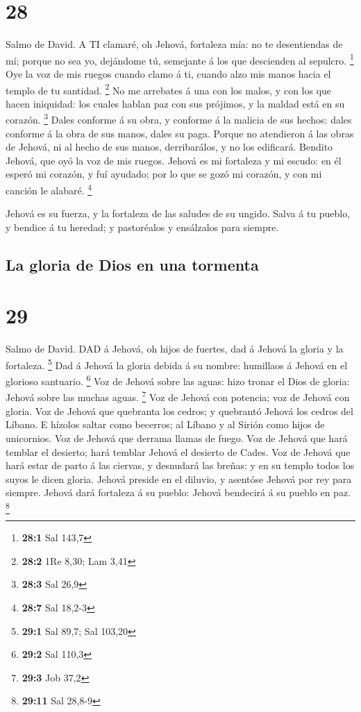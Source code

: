 \hypertarget{section-27}{%
\section{28}\label{section-27}}

 Salmo de David. A TI clamaré, oh Jehová, fortaleza mía: no
te desentiendas de mí; porque no sea yo, dejándome tú, semejante á los
que descienden al sepulcro. \footnote{\textbf{28:1} Sal 143,7}
 Oye la voz de mis ruegos cuando clamo á ti, cuando alzo mis
manos hacia el templo de tu santidad. \footnote{\textbf{28:2} 1Re 8,30;
  Lam 3,41}  No me arrebates á una con los malos, y con los
que hacen iniquidad: los cuales hablan paz con sus prójimos, y la maldad
está en su corazón. \footnote{\textbf{28:3} Sal 26,9}  Dales
conforme á su obra, y conforme á la malicia de sus hechos: dales
conforme á la obra de sus manos, dales su paga.  Porque no
atendieron á las obras de Jehová, ni al hecho de sus manos,
derribarálos, y no los edificará.  Bendito Jehová, que oyó
la voz de mis ruegos.  Jehová es mi fortaleza y mi escudo:
en él esperó mi corazón, y fuí ayudado; por lo que se gozó mi corazón, y
con mi canción le alabaré. \footnote{\textbf{28:7} Sal 18,2-3}

 Jehová es su fuerza, y la fortaleza de las saludes de su
ungido.  Salva á tu pueblo, y bendice á tu heredad; y
pastoréalos y ensálzalos para siempre.

\hypertarget{la-gloria-de-dios-en-una-tormenta}{%
\subsection{La gloria de Dios en una
tormenta}\label{la-gloria-de-dios-en-una-tormenta}}

\hypertarget{section-28}{%
\section{29}\label{section-28}}

 Salmo de David. DAD á Jehová, oh hijos de fuertes, dad á
Jehová la gloria y la fortaleza. \footnote{\textbf{29:1} Sal 89,7; Sal
  103,20}  Dad á Jehová la gloria debida á su nombre:
humillaos á Jehová en el glorioso santuario. \footnote{\textbf{29:2} Sal
  110,3}  Voz de Jehová sobre las aguas: hizo tronar el Dios
de gloria: Jehová sobre las muchas aguas. \footnote{\textbf{29:3} Job
  37,2}  Voz de Jehová con potencia; voz de Jehová con
gloria.  Voz de Jehová que quebranta los cedros; y quebrantó
Jehová los cedros del Líbano.  E hízolos saltar como
becerros; al Líbano y al Sirión como hijos de unicornios. 
Voz de Jehová que derrama llamas de fuego.  Voz de Jehová
que hará temblar el desierto; hará temblar Jehová el desierto de Cades.
 Voz de Jehová que hará estar de parto á las ciervas, y
desnudará las breñas: y en su templo todos los suyos le dicen gloria.
 Jehová preside en el diluvio, y asentóse Jehová por rey
para siempre.  Jehová dará fortaleza á su pueblo: Jehová
bendecirá á su pueblo en paz. \footnote{\textbf{29:11} Sal 28,8-9}

